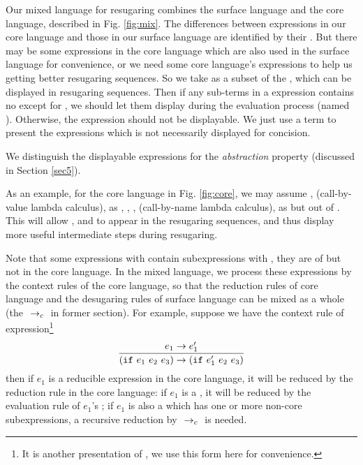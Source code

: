 Our mixed language for resugaring combines the surface language and the core language, described in Fig.  \ref{fig:mix}.
%
The differences between expressions in our core language and those in our surface language are identified by their . But there may be some expressions in the core language which are also used in the surface language for convenience, or we need some core language's expressions to help us getting better resugaring sequences. So we take  as a subset of the , which can be displayed in resugaring sequences. Then if any sub-terms in a expression contains no  except for , we should let them display during the evaluation process (named ). Otherwise, the expression should not be displayable. We just use a  term to present the expressions which is not necessarily displayed for concision.

We distinguish the displayable expressions for the \emph{abstraction} property (discussed in Section \ref{sec5}).


As an example, for the core language in Fig.  \ref{fig:core},
we may assume ,  (call-by-value lambda calculus),  as , , ,  (call-by-name lambda calculus),  as  but out of . This will allow ,  and  to appear in the resugaring sequences, and thus display more useful intermediate steps during resugaring.

Note that some expressions with  contain subexpressions with , they are of  but not in the core language. In the mixed language, we process these expressions by the context rules of the core language, so that the reduction rules of core language and the desugaring rules of surface language can be mixed as a whole (the $~\rightarrow_c~$ in former section). For example, suppose we have the context rule of  expression\footnote{It is another presentation of , we use this form here for convenience.}
\[
\infer{(\m{if}~e_1~e_2~e_3) \rightarrow (\m{if}~e_1'~e_2~e_3)}{e_1 \rightarrow e_1'}
\]
then if $e_1$ is a reducible expression in the core language, it will be reduced by the reduction rule in the core language: if $e_1$ is a , it will be reduced by the evaluation rule of $e_1$'s ; if $e_1$ is also a  which has one or more non-core subexpressions, a recursive reduction by $~\rightarrow_c~$ is needed.


